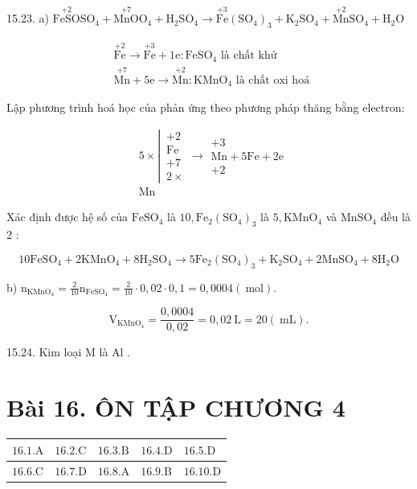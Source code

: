 \documentclass[10pt]{article}
\begin{document}
15.23. a) $\stackrel{+2}{\mathrm{FeSO}} \mathrm{SO}_{4}+\stackrel{+7}{\mathrm{MnO}} \mathrm{O}_{4}+\mathrm{H}_{2} \mathrm{SO}_{4} \longrightarrow \stackrel{+3}{\mathrm{Fe}}\left(\mathrm{SO}_{4}\right)_{3}+\mathrm{K}_{2} \mathrm{SO}_{4}+\stackrel{+2}{\mathrm{Mn}} \mathrm{SO}_{4}+\mathrm{H}_{2} \mathrm{O}$

$$
\begin{aligned}
& \stackrel{+2}{\mathrm{Fe}} \longrightarrow \stackrel{+3}{\mathrm{Fe}}+1 \mathrm{e}: \mathrm{FeSO}_{4} \text { là chất khử } \\
& \stackrel{+7}{\mathrm{Mn}}+5 \mathrm{e} \longrightarrow \stackrel{+2}{\mathrm{Mn}}: \mathrm{KMnO}_{4} \text { là chất oxi hoá }
\end{aligned}
$$

Lập phương trình hoá học của phản ứng theo phương pháp thăng bằng electron:

$$
\begin{aligned}
& 5 \times \left\lvert\, \begin{array}{l}
+2 \\
\mathrm{Fe} \\
+7 \\
2 \times
\end{array} \longrightarrow \begin{array}{c}
+3 \\
\mathrm{Mn}+5 \mathrm{Fe}+2 \mathrm{e} \\
+2
\end{array}\right. \\
& \mathrm{Mn}
\end{aligned}
$$

Xác định được hệ số của $\mathrm{FeSO}_{4}$ là $10, \mathrm{Fe}_{2}\left(\mathrm{SO}_{4}\right)_{3}$ là $5, \mathrm{KMnO}_{4}$ và $\mathrm{MnSO}_{4}$ đều là 2 :

$$
10 \mathrm{FeSO}_{4}+2 \mathrm{KMnO}_{4}+8 \mathrm{H}_{2} \mathrm{SO}_{4} \rightarrow 5 \mathrm{Fe}_{2}\left(\mathrm{SO}_{4}\right)_{3}+\mathrm{K}_{2} \mathrm{SO}_{4}+2 \mathrm{MnSO}_{4}+8 \mathrm{H}_{2} \mathrm{O}
$$

b) $\mathrm{n}_{\mathrm{KMnO}_{4}}=\frac{2}{10} \mathrm{n}_{\mathrm{FeSO}_{4}}=\frac{2}{10} \cdot 0,02 \cdot 0,1=0,0004(\mathrm{~mol})$.

$$
\mathrm{V}_{\mathrm{KMnO}_{4}}=\frac{0,0004}{0,02}=0,02 \mathrm{~L}=20(\mathrm{~mL}) .
$$

15.24. Kim loại M là Al .

\section*{Bài 16. ÔN TẬP CHƯƠNG 4}
\begin{center}
\begin{tabular}{|l|l|l|l|l|}
\hline
$16.1 . \mathrm{A}$ & $16.2 . \mathrm{C}$ & $16.3 . \mathrm{B}$ & $16.4 . \mathrm{D}$ & $16.5 . \mathrm{D}$ \\
\hline
$16.6 . \mathrm{C}$ & $16.7 . \mathrm{D}$ & $16.8 . \mathrm{A}$ & $16.9 . \mathrm{B}$ & $16.10 . \mathrm{D}$ \\
\hline
\end{tabular}
\end{center}
\end{document}
